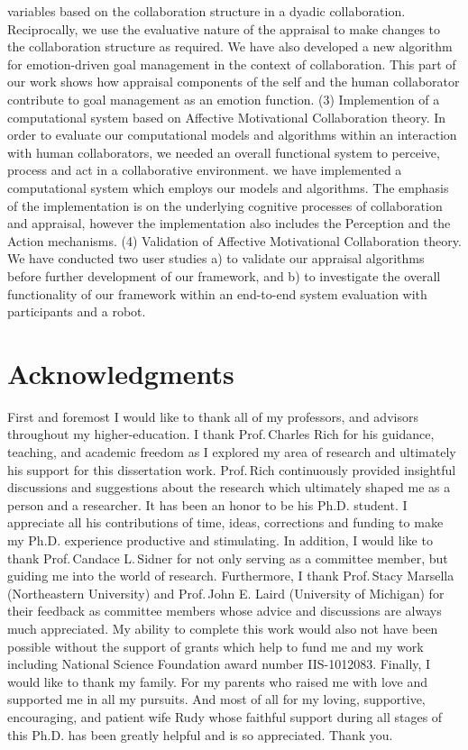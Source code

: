 \documentclass[12pt]{report}
\begin{document}
{variables based on the collaboration structure in a dyadic collaboration.
Reciprocally, we use the evaluative nature of the appraisal to make changes to
the collaboration structure as required. We have also developed a new
algorithm for emotion-driven goal management in the context of collaboration.
This part of our work shows how appraisal components of the self and the human
collaborator contribute to goal management as an emotion function. (3)
Implemention of a computational system based on Affective Motivational
Collaboration theory. In order to evaluate our computational models and
algorithms within an interaction with human collaborators, we needed an overall
functional system to perceive, process and act in a collaborative environment.
we have implemented a computational system which employs our models and
algorithms. The emphasis of the implementation is on the underlying cognitive
processes of collaboration and appraisal, however the implementation also
includes the Perception and the Action mechanisms. (4) Validation of Affective
Motivational Collaboration theory. We have conducted two user studies a) to
validate our appraisal algorithms before further development of our framework,
and b) to investigate the overall functionality of our framework within an
end-to-end system evaluation with participants and a robot.
}

\pagebreak

\chapter*{Acknowledgments}
First and foremost I would like to thank all of my professors, and advisors
throughout my higher-education. I thank Prof.\,Charles Rich for his guidance,
teaching, and academic freedom as I explored my area of research and ultimately
his support for this dissertation work. Prof.\,Rich continuously provided
insightful discussions and suggestions about the research which ultimately
shaped me as a person and a researcher. It has been an honor to be his Ph.D.
student. I appreciate all his contributions of time, ideas, corrections and
funding to make my Ph.D. experience productive and stimulating. In addition, I
would like to thank Prof.\,Candace L.\,Sidner for not only serving as a
committee member, but guiding me into the world of research. Furthermore, I
thank Prof.\,Stacy Marsella (Northeastern University) and Prof.\,John E. Laird
(University of Michigan) for their feedback as committee members whose advice
and discussions are always much appreciated. My ability to complete this work
would also not have been possible without the support of grants which help to
fund me and my work including National Science Foundation award number
IIS-1012083. Finally, I would like to thank my family. For my parents who raised
me with love and supported me in all my pursuits. And most of all for my loving,
supportive, encouraging, and patient wife Rudy whose faithful support during all
stages of this Ph.D. has been greatly helpful and is so appreciated. Thank you.
\end{document}
